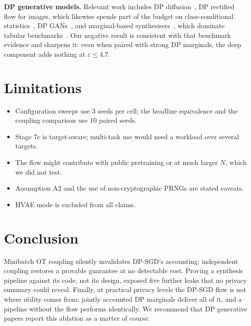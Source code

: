 \documentclass[journal]{IEEEtran}
\newcommand{\eps}{\varepsilon}
\begin{document}
\textbf{DP generative models.} Relevant work includes DP diffusion~\cite{dockhorn2023dpdm}, DP rectified flow for images, which likewise spends part of the budget on class-conditional statistics~\cite{che2026straightdp}, DP GANs~\cite{jordon2019pategan,rosenblatt2020dpsynth}, and marginal-based synthesisers~\cite{mckenna2021winning,mckenna2022aim}, which dominate tabular benchmarks~\cite{tao2021benchmarking}. Our negative result is consistent with that benchmark evidence and sharpens it: even when paired with strong DP marginals, the deep component adds nothing at $\eps\le4.7$.

\section{Limitations}
\begin{itemize}
\item Configuration sweeps use 3 seeds per cell; the headline equivalence and the coupling comparison use 10 paired seeds.
\item Stage 7c is target-aware; multi-task use would need a workload over several targets.
\item The flow might contribute with public pretraining or at much larger $N$, which we did not test.
\item Assumption A2 and the use of non-cryptographic PRNGs are stated caveats.
\item HVAE mode is excluded from all claims.
\end{itemize}

\section{Conclusion}
Minibatch OT coupling silently invalidates DP-SGD's accounting; independent coupling restores a provable guarantee at no detectable cost. Proving a synthesis pipeline against its code, not its design, exposed five further leaks that no privacy summary could reveal. Finally, at practical privacy levels the DP-SGD flow is not where utility comes from: jointly accounted DP marginals deliver all of it, and a pipeline without the flow performs identically. We recommend that DP generative papers report this ablation as a matter of course.



\end{document}
